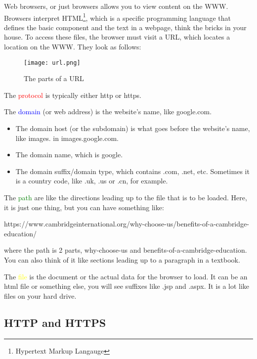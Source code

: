 \documentclass[../main.tex]{subfiles}
\begin{document}
Web browsers, or just browsers allows you to view content on the WWW. Browsers interpret HTML\footnote{Hypertext Markup Langauge}, which is a specific programming language that defines the basic component and the text in a webpage, think the bricks in your house. To access these files, the browser must visit a URL, which locates a location on the WWW. They look as follows:

\begin{figure}[H]
    \centering
    \texttt{[image: url.png]}
    \caption{The parts of a URL}
    \label{fig:url}
\end{figure}

The \textcolor{red}{protocol} is typically either {\ccmono http} or {\ccmono https}.

The \textcolor{blue}{domain} (or web address) is the website's name, like {\ccmono google.com}. 
\begin{itemize}
    \item The domain host (or the subdomain) is what goes before the website's name, like {\ccmono images.} in {\ccmono images.google.com}.
    \item The domain name, which is {\ccmono google}.
    \item The domain suffix/domain type, which contains {\ccmono .com}, {\ccmono .net}, etc. Sometimes it is a country code, like {\ccmono .uk}, {\ccmono .us} or {\ccmono .cn}, for example.
\end{itemize}

The \textcolor{green}{path} are like the directions leading up to the file that is to be loaded. Here, it is just one thing, but you can have something like:

{\ccmono https://www.cambridgeinternational.org/why-choose-us/benefits-of-a-cambridge-education/}

where the path is 2 parts, {\ccmono why-choose-us} and {\ccmono benefits-of-a-cambridge-education}. You can also think of it like sections leading up to a paragraph in a textbook. 

The \textcolor{yellow}{file} is the document or the actual data for the browser to load. It can be an html file or something else, you will see suffixes like {\ccmono .jsp} and {\ccmono .aspx}. It is a lot like files on your hard drive.

\subsection{HTTP and HTTPS}
\end{document}
